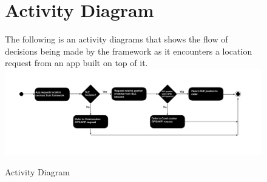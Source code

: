 \begin{figure}
\chapter{Activity Diagram}
The following is an activity diagrams that shows the flow of decisions being made by the framework as it encounters a location request from an app built on top of it.
\newline
\includegraphics[width=1\textwidth]{images/act.png}
\caption{Activity Diagram}
\end{figure}
